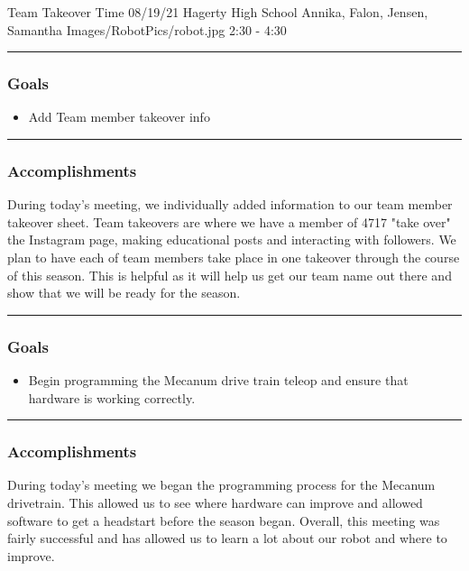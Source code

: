 \insertmeeting 
	{Team Takeover Time} 
	{08/19/21}
	{Hagerty High School}
	{Annika, Falon, Jensen, Samantha}
	{Images/RobotPics/robot.jpg}
	{2:30 - 4:30}
	
\noindent\hfil\rule{\textwidth}{.4pt}\hfil
\subsubsection*{Goals}
\begin{itemize}
    \item Add Team member takeover info  

\end{itemize} 

\noindent\hfil\rule{\textwidth}{.4pt}\hfil

\subsubsection*{Accomplishments}
During today's meeting, we individually added information to our team member takeover sheet. Team takeovers are where we have a member of 4717 "take over" the Instagram page, making educational posts and interacting with followers. We plan to have each of team members take place in one takeover through the course of this season. This is helpful as it will help us get our team name out there and show that we will be ready for the season.

\noindent\hfil\rule{\textwidth}{.4pt}\hfil
\subsubsection*{Goals}
\begin{itemize}
    \item Begin programming the Mecanum drive train teleop and ensure that hardware is working correctly.

\end{itemize} 

\noindent\hfil\rule{\textwidth}{.4pt}\hfil

\subsubsection*{Accomplishments}
During today's meeting we began the programming process for the Mecanum drivetrain. This allowed us to see where hardware can improve and allowed software to get a headstart before the season began. Overall, this meeting was fairly successful and has allowed us to learn a lot about our robot and where to improve.

